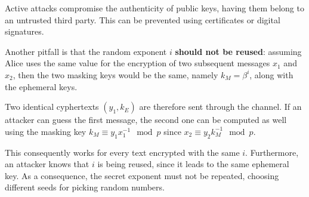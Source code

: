 Active attacks compromise the authenticity of public keys, having them belong to an untrusted third party. This can be prevented using certificates or digital signatures.

Another pitfall is that the random exponent $i$ \textbf{should not be reused}: assuming Alice uses the same value for the encryption of two subsequent messages $x_1$ and $x_2$, then the two masking keys would be the same, namely $k_M = \beta^i$, along with the ephemeral keys.

Two identical cyphertexts $(y_1, k_E)$ are therefore sent through the channel. If an attacker can guess the first message, the second one can be computed as well using the masking key $k_M \equiv y_1x_1^{-1} \mod p$ since $x_2 \equiv y_2k_M^{-1} \mod p$.

This consequently works for every text encrypted with the same $i$. Furthermore, an attacker knows that $i$ is being reused, since it leads to the same ephemeral key. As a consequence, the secret exponent must not be repeated, choosing different seeds for picking random numbers. 
